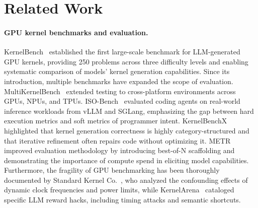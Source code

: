 \documentclass[]{fairmeta}
\begin{document}
\clearpage
\newpage



\clearpage
\newpage
\beginappendix

\section{Related Work}
\label{app:related}

\paragraph{GPU kernel benchmarks and evaluation.}
KernelBench~\citep{kernelbench} established the first large-scale benchmark for LLM-generated GPU kernels, providing 250 problems across three difficulty levels and enabling systematic comparison of models' kernel generation capabilities.
Since its introduction, multiple benchmarks have expanded the scope of evaluation. MultiKernelBench~\citep{wen2025multikernelbench} extended testing to cross-platform environments across GPUs, NPUs, and TPUs. ISO-Bench~\citep{nangia2026isobench} evaluated coding agents on real-world inference workloads from vLLM and SGLang, emphasizing the gap between hard execution metrics and soft metrics of programmer intent. KernelBenchX~\citep{wang2026kernelbenchx} highlighted that kernel generation correctness is highly category-structured and that iterative refinement often repairs code without optimizing it. METR~\citep{metr} improved evaluation methodology by introducing best-of-N scaffolding and demonstrating the importance of compute spend in eliciting model capabilities. Furthermore, the fragility of GPU benchmarking has been thoroughly documented by Standard Kernel Co.~\citep{standardkernel2026faster}, who analyzed the confounding effects of dynamic clock frequencies and power limits, while KernelArena~\citep{kernelarena2026resources} cataloged specific LLM reward hacks, including timing attacks and semantic shortcuts.
\end{document}

